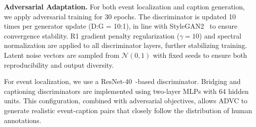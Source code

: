 \textbf{Adversarial Adaptation.} For both event localization and caption generation, we apply adversarial training for 30 epochs.
The discriminator is updated 10 times per generator update (D:G = 10:1), in line with StyleGAN2~\cite{Zhu2017-cy} to ensure convergence stability.
R1 gradient penalty regularization ($\gamma = 10$) and spectral normalization are applied to all discriminator layers, further stabilizing training.
Latent noise vectors are sampled from $\mathcal{N}(0, 1)$ with fixed seeds to ensure both reproducibility and output diversity.

For event localization, we use a ResNet-40~\cite{He2016-qc}-based discriminator. Bridging and captioning discriminators are implemented using two-layer MLPs with 64 hidden units.
This configuration, combined with adversarial objectives, allows ADVC to generate realistic event-caption pairs that closely follow the distribution of human annotations.

